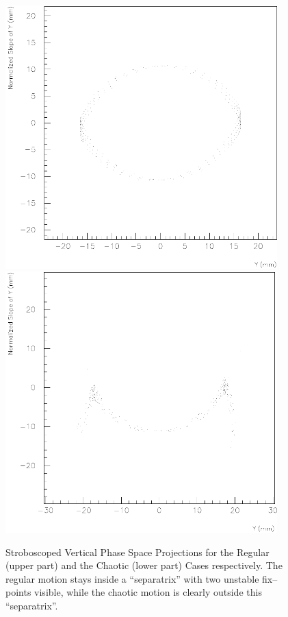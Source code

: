 \documentclass[a4paper,11pt]{report}
\begin{document}
\begin{figure}[H]
\begin{center}
  \mbox{\includegraphics*[width=10.5cm]{exp6}}
  \\[5mm]
  \mbox{\includegraphics*[width=10.5cm]{exp14}}
 \caption{\small{Stroboscoped Vertical Phase Space Projections
     for the Regular (upper part) and the Chaotic (lower part) Cases
     respectively.  The regular motion stays inside a ``separatrix''
     with two unstable fix--points visible, while the chaotic motion
     is clearly outside this ``separatrix''.}}
 \label{P-stro}
\end{center}
\end{figure}
\end{document}
